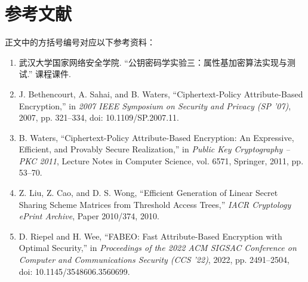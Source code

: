 \section{参考文献}

正文中的方括号编号对应以下参考资料：

\begingroup
\small
\sloppy
\begin{enumerate}
    \item[{[1]}] 武汉大学国家网络安全学院. ``公钥密码学实验三：属性基加密算法实现与测试.'' 课程课件.
    \item[{[2]}] J. Bethencourt, A. Sahai, and B. Waters, ``Ciphertext-Policy Attribute-Based Encryption,'' in \emph{2007 IEEE Symposium on Security and Privacy (SP '07)}, 2007, pp. 321--334, doi: 10.1109/SP.2007.11.
    \item[{[3]}] B. Waters, ``Ciphertext-Policy Attribute-Based Encryption: An Expressive, Efficient, and Provably Secure Realization,'' in \emph{Public Key Cryptography -- PKC 2011}, Lecture Notes in Computer Science, vol. 6571, Springer, 2011, pp. 53--70.
    \item[{[4]}] Z. Liu, Z. Cao, and D. S. Wong, ``Efficient Generation of Linear Secret Sharing Scheme Matrices from Threshold Access Trees,'' \emph{IACR Cryptology ePrint Archive}, Paper 2010/374, 2010.
    \item[{[5]}] D. Riepel and H. Wee, ``FABEO: Fast Attribute-Based Encryption with Optimal Security,'' in \emph{Proceedings of the 2022 ACM SIGSAC Conference on Computer and Communications Security (CCS '22)}, 2022, pp. 2491--2504, doi: 10.1145/3548606.3560699.
\end{enumerate}
\endgroup
